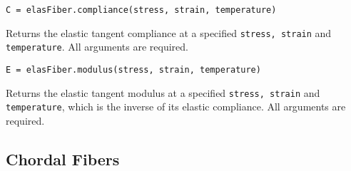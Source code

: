 \medskip\noindent
\texttt{C = elasFiber.compliance(stress, strain, temperature)}

\medskip\noindent
Returns the elastic tangent compliance at a specified \texttt{stress, strain} and \texttt{temperature}.  All arguments are required.

\medskip\noindent
\texttt{E = elasFiber.modulus(stress, strain, temperature)}

\medskip\noindent
Returns the elastic tangent modulus at a specified \texttt{stress, strain} and \texttt{temperature}, which is the inverse of its elastic compliance.  All arguments are required.


\subsection{Chordal Fibers}


